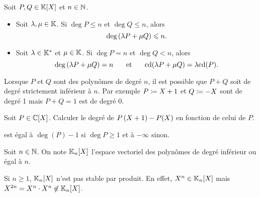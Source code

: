 \documentclass{magnolia}
\begin{document}
\begin{proposition}
Soit $P,Q\in\polyK$ et $n\in\mathbb{N}$.
\begin{itemize}
\item Soit $\lambda,\mu\in\mathbb{K}$. Si $\deg P\leq n$ et $\deg Q\leq n$, alors
  \[\deg\left(\lambda P+\mu Q\right)\leqslant n.\]
\item Soit $\lambda\in\mathbb{K}^*$ et $\mu\in\mathbb{K}$. Si $\deg P=n$ et $\deg Q<n$, alors
  \[\deg\left(\lambda P+\mu Q\right)=n \quad\quad\!\text{et}\quad\!\quad {\rm cd}(\lambda P+\mu Q)=\lambda{\rm cd}(P).\]
\end{itemize}
\end{proposition}

\begin{remarqueUnique}
\remarque Lorsque $P$ et $Q$ sont des polynômes de degré $n$, il est possible que
  $P+Q$ soit de degré strictement inférieur à $n$. Par exemple $P\coloneqq X+1$ et
  $Q\coloneqq -X$ sont de degré 1 mais $P+Q=1$ est de degré 0.
\end{remarqueUnique}

\begin{exoUnique}
\exo Soit $P\in\polyC$.
  Calculer le degré de $P\left(X+1\right)-P(X)$ en fonction de celui de $P$.
  \begin{sol}
  est égal à $\deg(P)-1$ si $\deg P\geq 1$ et à $-\infty$ sinon.  
  \end{sol}
\end{exoUnique}

\begin{definition}
Soit $n\in\mathbb{N}$. On note $\polyK[n]$ l'espace vectoriel des polynômes de degré inférieur ou égal à $n$.
\end{definition}

\begin{remarqueUnique}
\remarque Si $n\geq 1$, $\polyK[n]$ n'est pas stable par produit. En effet,
  $X^n\in\polyK[n]$ mais $X^{2n}=X^{n}\cdot X^n\not\in\polyK[n]$.
\end{remarqueUnique}


\end{document}
